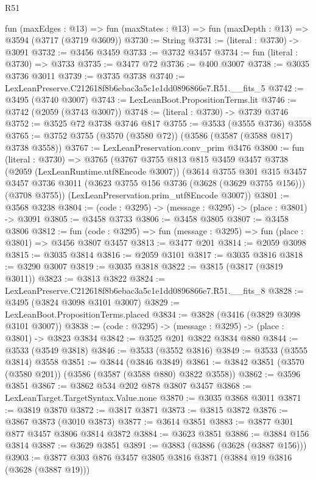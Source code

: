 \begin{lexlean}{R51}
\begin{coremodule}
  fun (maxEdges : @13) =>
  fun (maxStates : @13) => fun (maxDepth : @13) => @3594 (@3717 (@3719 @3609))
@3730 := String
@3731 := (literal : @3730) -> @3091
@3732 := @3456 @3459
@3733 := @3732 @3457
@3734 := fun (literal : @3730) => @3733
@3735 := @3477 @72
@3736 := @400 @3007
@3738 := @3035 @3736 @3011
@3739 := @3735 @3738
@3740 := LexLeanPreserve.C212618f8b6ebac3a5c1e1dd0896866e7.R51.__fits_5
@3742 := @3495 (@3740 @3007)
@3743 := LexLeanBoot.PropositionTerms.lit
@3746 := @3742 (@2059 (@3743 @3007))
@3748 := (literal : @3730) -> @3739 @3746
@3752 := @3525 @72 @3738 @3746 @817
@3755 := @3533 (@3555 @3736) @3558
@3765 := @3752 @3755 (@3570 (@3580 @72)) (@3586 (@3587 (@3588 @817) @3738 @3558))
@3767 := LexLeanPreservation.conv_prim @3476
@3800 := fun (literal : @3730) =>
  @3765
    (@3767
      @3755
      @813
      @815
      @3459
      @3457
      @3738
      (@2059 (LexLeanRuntime.utf8Encode @3007))
      (@3614
        @3755
        @301
        @315
        @3457
        @3457
        @3736
        @3011
        (@3623 @3755 @156 @3736 (@3628 (@3629 @3755 @156)))
        (@3708 @3755))
      (LexLeanPreservation.prim_utf8Encode @3007))
@3801 := @3568 @3238
@3804 := (code : @3295) -> (message : @3295) -> (place : @3801) -> @3091
@3805 := @3458 @3733
@3806 := @3458 @3805
@3807 := @3458 @3806
@3812 := fun (code : @3295) => fun (message : @3295) => fun (place : @3801) => @3456 @3807 @3457
@3813 := @3477 @201
@3814 := @2059 @3098
@3815 := @3035 @3814
@3816 := @2059 @3101
@3817 := @3035 @3816
@3818 := @3290 @3007
@3819 := @3035 @3818
@3822 := @3815 (@3817 (@3819 @3011))
@3823 := @3813 @3822
@3824 := LexLeanPreserve.C212618f8b6ebac3a5c1e1dd0896866e7.R51.__fits_8
@3828 := @3495 (@3824 @3098 @3101 @3007)
@3829 := LexLeanBoot.PropositionTerms.placed
@3834 := @3828 (@3416 (@3829 @3098 @3101 @3007))
@3838 := (code : @3295) -> (message : @3295) -> (place : @3801) -> @3823 @3834
@3842 := @3525 @201 @3822 @3834 @880
@3844 := @3533 (@3549 @3818)
@3846 := @3533 (@3552 @3816)
@3849 := @3533 (@3555 @3814) @3558
@3851 := @3844 (@3846 @3849)
@3861 := @3842 @3851 (@3570 (@3580 @201)) (@3586 (@3587 (@3588 @880) @3822 @3558))
@3862 := @3596 @3851
@3867 := @3862 @534 @202 @878 @3807 @3457
@3868 := LexLeanTarget.TargetSyntax.Value.none
@3870 := @3035 @3868 @3011
@3871 := @3819 @3870
@3872 := @3817 @3871
@3873 := @3815 @3872
@3876 := @3867 @3873 (@3010 @3873)
@3877 := @3614 @3851
@3883 := @3877 @301 @877 @3457 @3806 @3814 @3872
@3884 := @3623 @3851
@3886 := @3884 @156 @3814
@3887 := @3629 @3851
@3891 := @3883 (@3886 (@3628 (@3887 @156)))
@3903 := @3877 @303 @876 @3457 @3805 @3816 @3871 (@3884 @19 @3816 (@3628 (@3887 @19)))

\end{coremodule}
\end{lexlean}
